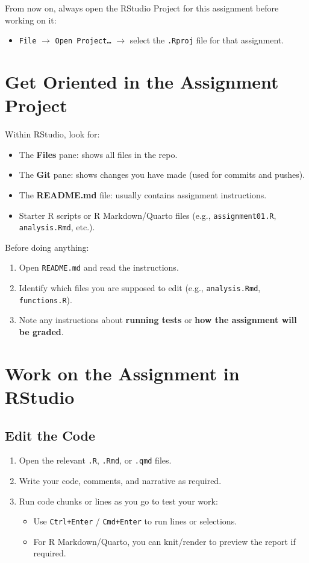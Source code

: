 \documentclass[11pt]{scrartcl}
\begin{document}
From now on, always open the RStudio Project for this assignment before working on it:
\begin{itemize}[nosep]
  \item \texttt{File} $\rightarrow$ \texttt{Open Project\ldots} $\rightarrow$ select the \texttt{.Rproj} file for that assignment.
\end{itemize}

\section{Get Oriented in the Assignment Project}

Within RStudio, look for:

\begin{itemize}[nosep]
  \item The \textbf{Files} pane: shows all files in the repo.
  \item The \textbf{Git} pane: shows changes you have made (used for commits and pushes).
  \item The \textbf{README.md} file: usually contains assignment instructions.
  \item Starter R scripts or R Markdown/Quarto files (e.g., \texttt{assignment01.R}, \texttt{analysis.Rmd}, etc.).
\end{itemize}

Before doing anything:

\begin{enumerate}[label=\arabic*., nosep]
  \item Open \texttt{README.md} and read the instructions.
  \item Identify which files you are supposed to edit (e.g., \texttt{analysis.Rmd}, \texttt{functions.R}).
  \item Note any instructions about \textbf{running tests} or \textbf{how the assignment will be graded}.
\end{enumerate}

\section{Work on the Assignment in RStudio}

\subsection{Edit the Code}

\begin{enumerate}[label=\arabic*., nosep]
  \item Open the relevant \texttt{.R}, \texttt{.Rmd}, or \texttt{.qmd} files.
  \item Write your code, comments, and narrative as required.
  \item Run code chunks or lines as you go to test your work:
  \begin{itemize}[nosep]
    \item Use \texttt{Ctrl+Enter} / \texttt{Cmd+Enter} to run lines or selections.
    \item For R Markdown/Quarto, you can knit/render to preview the report if required.
  \end{itemize}
\end{enumerate}
\end{document}
